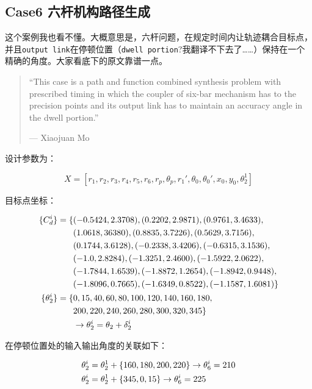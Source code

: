 \documentclass[]{ctexbook}
\begin{document}
\subsection{Case6 六杆机构路径生成}\label{case6-}

这个案例我也看不懂。大概意思是，六杆问题，在规定时间内让轨迹耦合目标点，并且\texttt{output\ link}在停顿位置（\texttt{dwell\ portion}?我翻译不下去了\ldots{}\ldots{}）保持在一个精确的角度。大家看底下的原文靠谱一点。

\begin{quote}
``This case is a path and function combined synthesis problem with
prescribed timing in which the coupler of six-bar mechanism has to the
precision points and its output link has to maintain an accuracy angle
in the dwell portion.''

\begin{flushright}--- Xiaojuan Mo\end{flushright}
\end{quote}

设计参数为：

\[
X = [r_1,r_2,r_3,r_4,r_5,r_6,r_p,\theta_p,r_1',\theta_0,\theta_0',x_0,y_0,\theta_2^1] 
\]

目标点坐标：

\begin{align}
\{C_d^i\} = \{&(-0.5424,2.3708),(0.2202,2.9871),(0.9761,3.4633), \notag \\
&(1.0618,36380),(0.8835,3.7226),(0.5629,3.7156),\notag \\
&(0.1744,3.6128),(-0.2338,3.4206),(-0.6315,3.1536), \notag \\
&(-1.0,2.8284),(-1.3251,2.4600),(-1.5922,2.0622), \notag \\
&(-1.7844,1.6539),(-1.8872,1.2654),(-1.8942,0.9448), \notag \\
&(-1.8096,0.7665),(-1.6349,0.8522),(-1.1587,1.6081)\} \notag \\
\{\theta_2^i\} = \{&0,15,40,60,80,100,120,140,160,180,\notag \\
& 200, 220,240,260,280,300,320,345\} \notag \\
& \rightarrow \theta_2^i = \theta_2 + \delta_2^i \notag \\
\end{align}

在停顿位置处的输入输出角度的关联如下：

\begin{align}
&\theta_2^i = \theta_2^1+\{160,180,200,220\}\rightarrow \theta_6^i=210 \notag \\
&\theta_2^i=\theta_2^1+\{345,0,15\} \rightarrow \theta_6^i = 225 \notag \\
\end{align}
\end{document}
